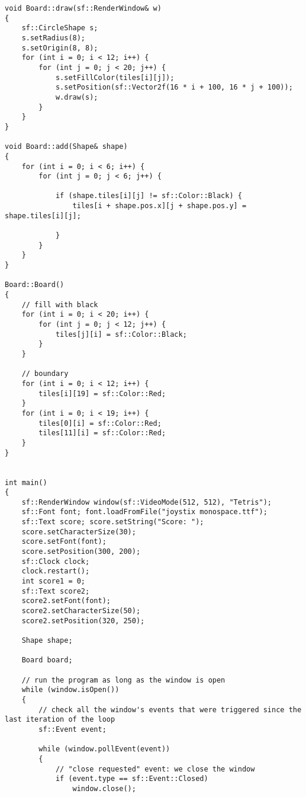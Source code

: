 \documentclass[11pt]{amsart}
\begin{document}
\begin{verbatim}
void Board::draw(sf::RenderWindow& w)
{
    sf::CircleShape s;
    s.setRadius(8);
    s.setOrigin(8, 8);
    for (int i = 0; i < 12; i++) {
        for (int j = 0; j < 20; j++) {
            s.setFillColor(tiles[i][j]);
            s.setPosition(sf::Vector2f(16 * i + 100, 16 * j + 100));
            w.draw(s);
        }
    }
}

void Board::add(Shape& shape)
{
    for (int i = 0; i < 6; i++) {
        for (int j = 0; j < 6; j++) {

            if (shape.tiles[i][j] != sf::Color::Black) {
                tiles[i + shape.pos.x][j + shape.pos.y] = shape.tiles[i][j];

            }
        }
    }
}

Board::Board()
{
    // fill with black
    for (int i = 0; i < 20; i++) {
        for (int j = 0; j < 12; j++) {
            tiles[j][i] = sf::Color::Black;
        }
    }

    // boundary
    for (int i = 0; i < 12; i++) {
        tiles[i][19] = sf::Color::Red;
    }
    for (int i = 0; i < 19; i++) {
        tiles[0][i] = sf::Color::Red;
        tiles[11][i] = sf::Color::Red;
    }
}


int main()
{
    sf::RenderWindow window(sf::VideoMode(512, 512), "Tetris");
    sf::Font font; font.loadFromFile("joystix monospace.ttf");
    sf::Text score; score.setString("Score: ");
    score.setCharacterSize(30);
    score.setFont(font);
    score.setPosition(300, 200);
    sf::Clock clock;
    clock.restart();
    int score1 = 0;
    sf::Text score2;
    score2.setFont(font);
    score2.setCharacterSize(50);
    score2.setPosition(320, 250);

    Shape shape;

    Board board;

    // run the program as long as the window is open
    while (window.isOpen())
    {
        // check all the window's events that were triggered since the last iteration of the loop
        sf::Event event;

        while (window.pollEvent(event))
        {
            // "close requested" event: we close the window
            if (event.type == sf::Event::Closed)
                window.close();



\end{verbatim}
\end{document}
